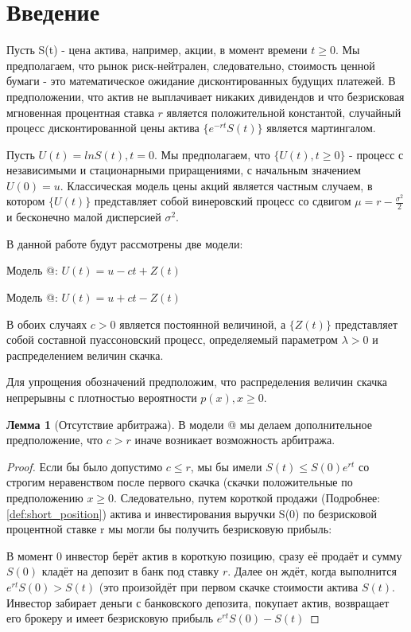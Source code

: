 \documentclass[a4paper,12pt]{article}
\makeatletter
\theoremstyle{definition}
\newtheorem{lemma}{Лемма}
\newcommand*{\rom}[1]{\expandafter\@slowromancap\romannumeral #1@}
\makeatother
\begin{document}

\section{Введение}

Пусть S(t) - цена актива, например, акции, в момент времени $t \ge 0$. Мы предполагаем, что рынок риск-нейтрален, следовательно, стоимость ценной бумаги - это математическое ожидание дисконтированных будущих платежей. В предположении, что актив не выплачивает никаких дивидендов и что безрисковая мгновенная процентная ставка $r$ является положительной константой, случайный процесс дисконтированной цены актива $\{e^{-rt} S(t)\}$ является мартингалом.

Пусть $U(t) = ln S(t), t = 0$. Мы предполагаем, что $\{U(t), t \ge 0\}$ - процесс с независимыми и стационарными приращениями, с начальным значением $U(0) = u$. Классическая модель цены акций является частным случаем, в котором $\{U(t)\}$ представляет собой винеровский процесс со сдвигом $\mu = r - \frac{\sigma ^ {2}}{2}$ и бесконечно малой дисперсией $\sigma ^ {2}$. 

В данной работе будут рассмотрены две модели:

Модель \rom{1}: $U(t) = u - ct + Z(t)$

Модель \rom{2}: $U(t) = u + ct - Z(t)$

В обоих случаях $c > 0$ является постоянной величиной, а $\{Z(t)\}$ представляет собой составной пуассоновский процесс, определяемый параметром $\lambda > 0$ и распределением величин скачка. 

\label{sec:positivityOfJumsAssumption} Для упрощения обозначений предположим, что распределения величин скачка
непрерывны с плотностью вероятности $p(x), x \ge 0$. 

\begin{lemma}[Отсутствие арбитража]\label{thm:no_arbitrage_theoreme}
В модели \rom{2} мы делаем дополнительное предположение, что $c > r$ иначе возникает возможность арбитража. 
\end{lemma}
\begin{proof}
Если бы было допустимо $c \le r$, мы бы имели $S(t) \le S(0)e^{rt}$ со строгим неравенством после первого скачка (скачки положительные по предположению $x \ge 0$. Следовательно, путем короткой продажи (Подробнее: \ref{def:short_position}) актива и инвестирования выручки S(0) по безрисковой процентной ставке r мы могли бы получить безрисковую прибыль:

В момент 0 инвестор берёт актив в короткую позицию, сразу её продаёт и сумму $S(0)$ кладёт на депозит в банк под ставку $r$. Далее он ждёт, когда выполнится $e^{rt} S(0) > S(t)$ (это произойдёт при первом скачке стоимости актива $S(t)$. Инвестор забирает деньги с банковского депозита, покупает актив, возвращает его брокеру и имеет безрисковую прибыль $e^{rt}S(0) - S(t)$
\end{proof}
\end{document}

